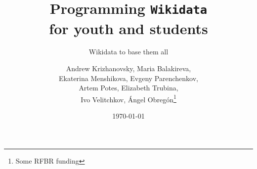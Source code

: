 \documentclass[
	fontsize=10pt, %
	twoside=false, %
	numbers=noenddot, %
]{kaobook}
\begin{document}

\titlehead{The \texttt{kaobook} class}
\subject{Petrozavodsk State University,\\Karelian Research Centre of RAS}

\title[Programming Wikidata for youth and students]{Programming {\normalfont\texttt{Wikidata}} \\ for youth and students}

\subtitle{Wikidata to base them all}

\author[Andrew Krizhanovsky, Maria Balakireva, \\ Ekaterina Menshikova, Evgeny Parenchenkov, \\ Artem Potes, Elizabeth Trubina, \\ Ivo Velitchkov, Ángel Obregón]{Andrew Krizhanovsky, Maria Balakireva, \\ Ekaterina Menshikova, Evgeny Parenchenkov, \\ Artem Potes, Elizabeth Trubina, \\ Ivo Velitchkov, Ángel Obregón\thanks{Some RFBR funding}}

\date{\today}

\publishers{An Awesome Publisher}


\frontmatter %



\end{document}

